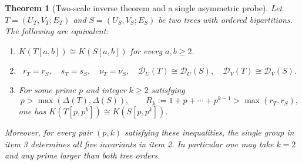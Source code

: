 \documentclass[11pt,a4paper]{article}
\newtheorem{theorem}{Theorem}[section]
\theoremstyle{definition}\newtheorem{definition}[theorem]{Definition}
\theoremstyle{remark}\newtheorem{remark}[theorem]{Remark}
\numberwithin{equation}{section}
\begin{document}
\begin{theorem}[Two-scale inverse theorem and a single asymmetric probe]
\label{ext-keio-inverse}
Let $T=(U_T,V_T;E_T)$ and $S=(U_S,V_S;E_S)$ be two trees with ordered
bipartitions.  The following are equivalent:
\begin{enumerate}
\item $K(T[a,b])\cong K(S[a,b])$ for every $a,b\geq2$.
\item
\[
 r_T=r_S,\quad s_T=s_S,\quad \nu_T=\nu_S,\quad
 \mathcal D_U(T)\cong\mathcal D_U(S),\quad
 \mathcal D_V(T)\cong\mathcal D_V(S).
\]
\item For some prime $p$ and integer $k\geq2$ satisfying
\[
 p>\max(\Delta(T),\Delta(S)),\qquad
 R_k:=1+p+\cdots+p^{k-1}>\max(r_T,r_S),                      \label{ext-keio-probe-condition}
\]
one has $K(T[p,p^k])\cong K(S[p,p^k])$.
\end{enumerate}
Moreover, for every pair $(p,k)$ satisfying these inequalities, the single
group in item 3 determines all five invariants in item 2.  In particular one
may take $k=2$ and any prime larger than both tree orders.
\end{theorem}
\end{document}
